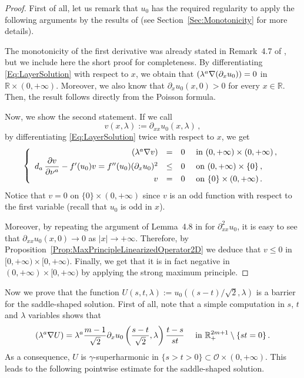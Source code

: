 \documentclass[12pt,reqno]{amsart}
\theoremstyle{definition}
\theoremstyle{remark}
\newcommand{\con}[1]{\mathbb{#1}}
\newcommand{\R}{\con{R}} %
\newcommand{\ocal}{\mathcal{O}}
\newcommand{\s}{\gamma}
\newcommand{\bpar}[1]{\left ( {#1}\right )}
\newcommand\beqc[1]{\left\{\begin{array}{#1}}
\newcommand\eeqc{\end{array} \right.}
\def\PDEsystem{rcll}
\let\div\relax
\DeclareMathOperator{\div}{div}
\numberwithin{equation}{section}
\begin{document}
\begin{proof}
First of all, let us remark that $u_0$ has the required regularity to apply the following arguments by the results of \cite{CabreSireI} (see Section~\ref{Sec:Monotonicity} for more details).


The monotonicity of the first derivative was already stated in Remark~4.7 of \cite{CabreSireI}, but we include here the short proof for completeness. By differentiating \eqref{Eq:LayerSolution} with respect to $x$, we obtain that $\div(\lambda^a \nabla (\partial_x u_0)) = 0$ in $\R\times (0,+\infty)$. Moreover, we also know that $\partial_x u_0(x,0) > 0$ for every $x\in \R$. Then, the result follows directly from the Poisson formula.

Now, we show the second statement. If we call 
$$
v(x,\lambda) := \partial_{xx} u_0(x,\lambda)\,,
$$
by differentiating \eqref{Eq:LayerSolution} twice with respect to $x$, we get
\begin{equation*}
\beqc{\PDEsystem}
\div(\lambda^a \nabla v) &=& 0 & \text{ in } (0,+\infty)\times (0,+\infty) \,, \\
d_a\,\dfrac{\partial v}{\partial \nu^a} - f'(u_0) v = f''(u_0) (\partial_x u_0) ^2 &\leq & 0 & \text{ on } (0,+\infty) \times \{0\} \,, \\
v & = & 0 & \text{ on } \{0\} \times (0,+\infty)\,.
\eeqc
\end{equation*}
Notice that $v = 0$ on $\{0\} \times (0,+\infty)$ since $v$ is an odd function with respect to the first variable (recall that $u_0$ is odd in $x$).

Moreover, by repeating the argument of Lemma~4.8 in \cite{CabreSireI} for $\partial^2_{xx} u_0$, it is easy to see that $\partial_{xx} u_0(x,0) \to 0$ as $|x|\to +\infty$. Therefore, by Proposition~\ref{Prop:MaxPrincipleLinearizedOperator2D} we deduce that $v\leq 0$ in $[0,+\infty)\times [0,+\infty)$. Finally, we get that it is in fact negative in $(0,+\infty)\times [0,+\infty)$ by applying the strong maximum principle.
\end{proof}

Now we prove that the function $U(s,t,\lambda) := u_0 ( (s-t)/\sqrt{2}, \lambda)$ is a barrier for the saddle-shaped solution. First of all, note that a simple computation in $s$, $t$ and $\lambda$ variables shows that
\begin{equation}
\label{Eq:EqForULayer}
\div (\lambda^a \nabla U) = \lambda^a \dfrac{m-1}{\sqrt{2}} \partial_x u_0 \bpar{\dfrac{s-t}{\sqrt{2}}, \lambda} \dfrac{t-s}{st} \quad \text{ in } \R^{2m + 1}_+ \setminus \{st=0\}\,.
\end{equation}
As a consequence, $U$ is $\s$-superharmonic in $\{s>t>0\} \subset \ocal \times (0, +\infty)$. This leads to the following pointwise estimate for the saddle-shaped solution.
\end{document}
